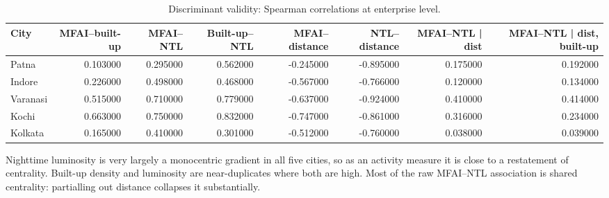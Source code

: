 \begin{table}[htbp]
\centering
\small
\caption{Discriminant validity: Spearman correlations at enterprise level.}
\label{tab:t11_correlations}
\begin{tabular}{lrrrrrrr}
\toprule
City & MFAI–built-up & MFAI–NTL & Built-up–NTL & MFAI–distance & NTL–distance & MFAI–NTL | dist & MFAI–NTL | dist, built-up \\
\midrule
Patna & 0.103000 & 0.295000 & 0.562000 & -0.245000 & -0.895000 & 0.175000 & 0.192000 \\
Indore & 0.226000 & 0.498000 & 0.468000 & -0.567000 & -0.766000 & 0.120000 & 0.134000 \\
Varanasi & 0.515000 & 0.710000 & 0.779000 & -0.637000 & -0.924000 & 0.410000 & 0.414000 \\
Kochi & 0.663000 & 0.750000 & 0.832000 & -0.747000 & -0.861000 & 0.316000 & 0.234000 \\
Kolkata & 0.165000 & 0.410000 & 0.301000 & -0.512000 & -0.760000 & 0.038000 & 0.039000 \\
\bottomrule
\end{tabular}
\begin{tablenotes}\footnotesize
\item Nighttime luminosity is very largely a monocentric gradient in all five cities, so as an activity measure it is close to a restatement of centrality. Built-up density and luminosity are near-duplicates where both are high. Most of the raw MFAI–NTL association is shared centrality: partialling out distance collapses it substantially.
\end{tablenotes}
\end{table}
